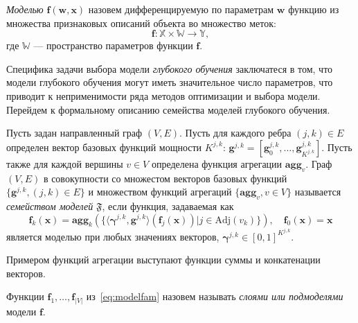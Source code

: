 \begin{defin}
\textit{Моделью} $\mathbf{f}(\mathbf{w}, \mathbf{x})$ назовем дифференцируемую по параметрам $\mathbf{w}$ функцию из множества признаковых описаний объекта во множество меток:
\[
    \mathbf{f}: \mathbb{X} \times \mathbb{W} \to \mathbb{Y},
\] 
где $\mathbb{W}$ --- пространство параметров функции $\mathbf{f}$.
\end{defin}
Специфика задачи  выбора модели \textit{глубокого обучения} заключатеся в том, что модели глубокого обучения могут иметь значительное число параметров, что приводит к неприменимости ряда методов оптимизации и выбора модели. 
Перейдем к формальному описанию семейства моделей глубокого обучения. 
\begin{defin}
Пусть задан направленный граф $(V,E)$. Пусть для каждого ребра $(j,k) \in E$ определен вектор базовых функций  мощности $K^{j,k}$: $\mathbf{g}^{j,k} = [\mathbf{g}^{j,k}_0, \dots, \mathbf{g}^{j,k}_{K^{j,k}}]$. Пусть также для каждой вершины $v \in V$ определена функция агрегации $\textbf{agg}_v$. Граф $(V, E)$ в совокупности со множестом векторов базовых функций $\{\mathbf{g}^{j,k}, (j,k) \in E\}$ и множеством функций агрегаций $\{ \textbf{agg}_v, {v \in V}\}$ называется \textit{семейством моделей} $\mathfrak{F}$, если функция, задаваемая как 
\begin{equation}
\label{eq:modelfam}
    \mathbf{f}_k(\mathbf{x}) = \textbf{agg}_k\left(\{ \langle \boldsymbol{\gamma}^{j,k}, \mathbf{g}^{j,k} \rangle \left(\mathbf{f}_j(\mathbf{x})\right)| j \in \text{Adj}(v_k)\}\right), \quad \mathbf{f}_0(\mathbf{x}) = \mathbf{x}
\end{equation}
является моделью при любых значениях векторов, $\boldsymbol{\gamma}^{j,k} \in [0,1]^{K^{j,k}}$.
\end{defin}
Примером функций агрегации выступают функции суммы и конкатенации векторов.

\begin{defin}
Функции $\mathbf{f}_1, \dots, \mathbf{f}_{|V|}$ из~\eqref{eq:modelfam} назовем называть \textit{слоями или подмоделями} модели $\mathbf{f}$.
\end{defin}


